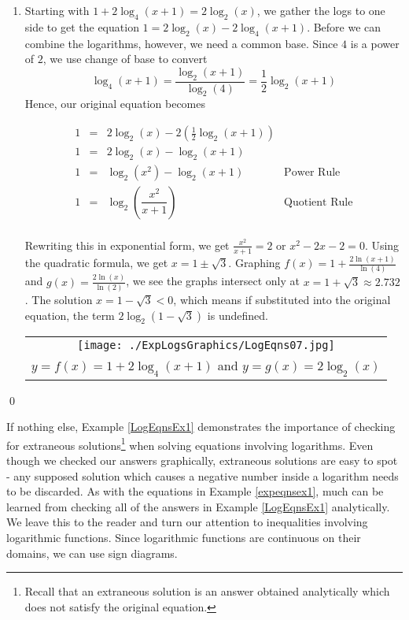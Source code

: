 \begin{ex}
\begin{enumerate}
\begin{center}
\end{center}

\item Starting with $1 + 2 \log_{4}(x+1) = 2 \log_{2}(x)$, we gather the logs to one side to get the equation $1 = 2 \log_{2}(x) - 2 \log_{4}(x+1)$.  Before we can combine the logarithms, however, we need a common base.  Since $4$ is a power of $2$, we use change of base to convert  \[\log_{4}(x+1) = \frac{\log_{2}(x+1)}{\log_{2}(4)} = \frac{1}{2} \log_{2}(x+1)\] Hence, our original equation becomes  

\[ \begin{array}{rclr}

1 & = & 2 \log_{2}(x) - 2 \left(\frac{1}{2} \log_{2}(x+1)\right) & \\ [2pt]
1 &= & 2\log_{2}(x) - \log_{2}(x+1) & \\ [2pt]
1 & = & \log_{2}\left(x^2\right) - \log_{2}(x+1) & \text{Power Rule} \\ [6pt]
1 & = & \log_{2}\left( \dfrac{x^{2}}{x+1}\right) & \text{Quotient Rule} \\ \end{array}\]

Rewriting this in exponential form, we get $ \frac{x^{2}}{x+1} = 2$ or $x^2 -2x-2 = 0$.  Using the quadratic formula, we get $x = 1 \pm \sqrt{3}$.  Graphing $f(x) = 1 + \frac{2\ln(x+1)}{\ln(4)}$ and $g(x) = \frac{2 \ln(x)}{\ln(2)}$, we see the graphs intersect only at $x = 1 + \sqrt{3} \approx 2.732$.  The solution $x = 1 - \sqrt{3} < 0$, which means if substituted into the original equation, the term $2 \log_{2}\left(1 - \sqrt{3}\right)$ is undefined.

\begin{center}
\begin{tabular}{c}

\texttt{[image: ./ExpLogsGraphics/LogEqns07.jpg]} \\

$y = f(x) = 1 + 2 \log_{4}(x+1)$ and \boldmath $y = g(x) = 2 \log_{2}(x)$ \\

\end{tabular}
\end{center}
\end{enumerate}

\qed
\end{ex}

If nothing else,  Example \ref{LogEqnsEx1} demonstrates the importance of checking for extraneous solutions\footnote{Recall that an extraneous solution is an answer obtained analytically which does not satisfy the original equation.} when solving equations involving logarithms.  Even though we checked our answers graphically, extraneous solutions are easy to spot - any supposed solution which causes a negative number inside a logarithm needs to be discarded.  As with the equations in Example \ref{expeqnsex1}, much can be learned from checking all of the answers in Example \ref{LogEqnsEx1} analytically.  We leave this to the reader and turn our attention to inequalities involving logarithmic functions.  Since logarithmic functions are continuous on their domains, we can use sign diagrams.  

